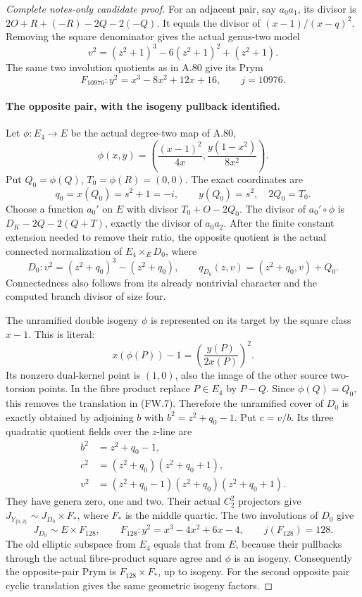 \begin{proof}[Complete notes-only candidate proof]
For an adjacent pair, say \(a_0a_1\), its divisor is
\(2O+R+(-R)-2Q-2(-Q)\). It equals the divisor of
\((x-1)/(x-q)^2\). Removing the square denominator gives the
actual genus-two model
\[
 v^2=(z^2+1)^3-6(z^2+1)^2+(z^2+1).
\]
The same two involution quotients as in A.80 give its Prym
\[
             F_{10976}:y^2=x^3-8x^2+12x+16,
                         \qquad j=10976.              \tag{FW.5}
\]

\paragraph{The opposite pair, with the isogeny pullback identified.}
Let \(\phi:E_4\to E\) be the actual degree-two map of A.80,
\[
 \phi(x,y)=\left(\frac{(x-1)^2}{4x},
                        \frac{y(1-x^2)}{8x^2}\right).
\]
Put \(Q_0=\phi(Q)\), \(T_0=\phi(R)=(0,0)\). The exact
coordinates are
\[
           q_0=x(Q_0)=s^2+1=-i,\qquad y(Q_0)=s^2,
                              \quad 2Q_0=T_0.          \tag{FW.6}
\]
Choose a function \(a_0'\) on \(E\) with divisor
\(T_0+O-2Q_0\). The divisor of \(a_0'\circ\phi\) is
\(D_K-2Q-2(Q+T)\), exactly the divisor of \(a_0a_2\).
After the finite constant extension needed to remove their ratio,
the opposite quotient is the actual connected normalization of
\(E_4\times_E D_0\), where
\[
 D_0:v^2=(z^2+q_0)^3-(z^2+q_0),\qquad
       q_{D_0}(z,v)=(z^2+q_0,v)+Q_0.                  \tag{FW.7}
\]
Connectedness also follows from its already nontrivial character
and the computed branch divisor of size four.

The unramified double isogeny \(\phi\) is represented on its
target by the square class \(x-1\). This is literal:
\[
       x(\phi(P))-1=\left(\frac{y(P)}{2x(P)}\right)^2.
                                                               \tag{FW.8}
\]
Its nonzero dual-kernel point is \((1,0)\), also the image of
the other source two-torsion points. In the fibre product replace
\(P\in E_4\) by \(P-Q\). Since \(\phi(Q)=Q_0\), this
removes the translation in (FW.7). Therefore the unramified cover
of \(D_0\) is exactly obtained by adjoining
\(b\) with \(b^2=z^2+q_0-1\). Put \(c=v/b\). Its
three quadratic quotient fields over the \(z\)-line are
\[
 \begin{aligned}
 b^2&=z^2+q_0-1,\\
 c^2&=(z^2+q_0)(z^2+q_0+1),\\
 v^2&=(z^2+q_0-1)(z^2+q_0)(z^2+q_0+1).
 \end{aligned}                                        \tag{FW.9}
\]
They have genera zero, one and two. Their actual \(C_2^2\)
projectors give \(J_{Y_{\{0,2\}}}\sim J_{D_0}\times F_*\),
where \(F_*\) is the middle quartic. The two involutions of
\(D_0\) give
\[
 J_{D_0}\sim E\times F_{128},\qquad
 F_{128}:y^2=x^3-4x^2+6x-4,\qquad j(F_{128})=128.
                                                               \tag{FW.10}
\]
The old elliptic subspace from \(E_4\) equals that from \(E\),
because their pullbacks through the actual fibre-product square
agree and \(\phi\) is an isogeny. Consequently the opposite-pair
Prym is \(F_{128}\times F_*\), up to isogeny.
For the second opposite pair cyclic translation gives the same
geometric isogeny factors.


\end{proof}
